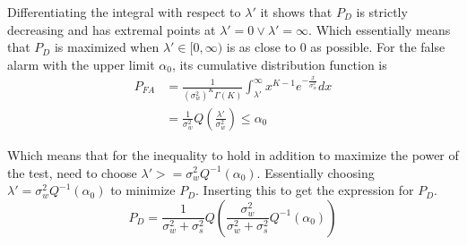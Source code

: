 Differentiating the integral with respect to $\lambda'$ it shows that $P_D$ is strictly decreasing and has extremal points at $\lambda'=0\vee\lambda'=\infty$. Which essentially means that $P_D$ is maximized when $\lambda'\in[0,\infty)$ is as close to $0$ as possible. For the false alarm with the upper limit $\alpha_0$, its cumulative distribution function is
\begin{align}
    P_{FA} & = \frac{1}{(\sigma_w^2)^K\Gamma(K)}\int_{\lambda'}^{\infty}x^{K-1}e^{-\frac{x}{\sigma_w^2}}dx\nonumber\\
    & = \frac{1}{\sigma_w^2}Q\left(\frac{\lambda'}{\sigma_w^2}\right) \leq \alpha_0
\end{align}

Which means that for the inequality to hold in addition to maximize the power of the test, need to choose $\lambda' >= \sigma_w^2Q^{-1}\left(\alpha_0\right)$. Essentially choosing $\lambda' = \sigma_w^2Q^{-1}\left(\alpha_0\right)$ to minimize $P_D$. Inserting this to get the expression for $P_D$.
\begin{equation}
    P_D = \frac{1}{\sigma_w^2+\sigma_s^2}Q(\frac{\sigma_w^2}{\sigma_w^2+\sigma_s^2}Q^{-1}\left(\alpha_0\right))
\end{equation}

